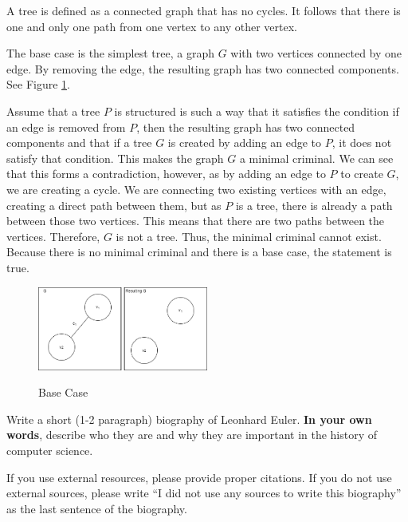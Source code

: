 \documentclass{article}
\begin{document}
	A tree is defined as a connected graph that has no cycles. It follows that there is one and only one path from one vertex to any other vertex.
	
	The base case is the simplest tree, a graph $G$ with two vertices connected by one edge. By removing the edge, the resulting graph has two connected components. See Figure \ref{graph}.
	
	Assume that a tree $P$ is structured is such a way that it satisfies the condition if an edge is removed from $P$, then the resulting graph has 
	two connected components and that if a tree $G$ is created by adding an edge to $P$, it does not satisfy that condition. This makes the graph $G$ a
	minimal criminal. We can see that this forms a contradiction, however, as by adding an edge to $P$ to create $G$, we are creating a cycle. We are 
	connecting two existing vertices with an edge, creating a direct path between them, but as $P$ is a tree, there is already a path between those two vertices.
	This means that there are two paths between the vertices. Therefore, $G$ is not a tree. Thus, the minimal criminal cannot exist.
	Because there is no minimal criminal and there is a base case, the statement is true.

 \begin{figure}
\caption{Base Case}
\centering
\includegraphics[width=0.5\textwidth]{images/graphBaseCase}
\label{graph}
\end{figure}


Write a short (1-2 paragraph) biography of Leonhard Euler.
\textbf{In your own words}, describe who they are and why they are important in
the history of computer science.

If you use external resources, please provide
proper citations. If you do not use external sources, please write ``I did not
use any sources to write this biography'' as the last sentence of the
biography.
\end{document}
